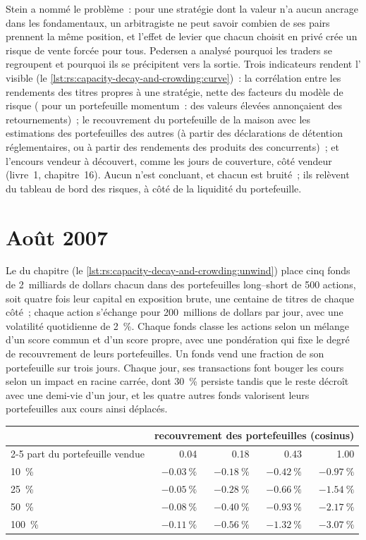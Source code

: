 Stein a nommé le problème~: pour une stratégie dont la valeur n'a aucun ancrage dans les fondamentaux, un arbitragiste ne peut savoir combien de ses pairs prennent la même position,
et l'effet de levier que chacun choisit en privé crée un risque de vente forcée pour tous. Pedersen a analysé pourquoi les traders se regroupent et pourquoi ils se précipitent vers la sortie. Trois indicateurs rendent l'
visible (le \cref{lst:rs:capacity-decay-and-crowding:curve})~: la corrélation entre les rendements des titres propres à une stratégie, nette des facteurs du modèle de risque (
pour un portefeuille momentum~: des valeurs élevées annonçaient des retournements)~; le recouvrement du portefeuille de la maison avec les estimations des portefeuilles des autres (à partir des déclarations de détention réglementaires, ou à partir
des rendements des produits des concurrents)~; et l'encours vendeur à découvert, comme les jours de couverture, côté vendeur (livre~1, chapitre~16). Aucun n'est concluant, et chacun est bruité~; ils
relèvent du tableau de bord des risques, à côté de la liquidité du portefeuille.

\section{Août 2007}

Le  du chapitre (le \cref{lst:rs:capacity-decay-and-crowding:unwind}) place cinq fonds de 2~milliards de dollars chacun dans des portefeuilles long--short de 500 actions, soit quatre fois leur
capital en exposition brute, une centaine de titres de chaque côté~; chaque action s'échange pour 200~millions de dollars par jour, avec une volatilité quotidienne de 2~\%. Chaque fonds classe les actions selon un mélange
d'un score commun et d'un score propre, avec une pondération qui fixe le degré de recouvrement de leurs portefeuilles. Un fonds vend une fraction de son portefeuille sur trois jours. Chaque jour, ses transactions
font bouger les cours selon un impact en racine carrée, dont 30~\% persiste tandis que le reste décroît avec une demi-vie d'un jour, et les quatre autres fonds valorisent leurs portefeuilles aux
cours ainsi déplacés.

\begin{center}
\small
\begin{tabular}{@{}lrrrr@{}}
\toprule
 & \multicolumn{4}{c}{recouvrement des portefeuilles (cosinus)}\\
\cmidrule(l){2-5}
part du portefeuille vendue & 0.04 & 0.18 & 0.43 & 1.00\\
\midrule
10~\% & $-0.03~\%$ & $-0.18~\%$ & $-0.42~\%$ & $-0.97~\%$\\
25~\% & $-0.05~\%$ & $-0.28~\%$ & $-0.66~\%$ & $-1.54~\%$\\
50~\% & $-0.08~\%$ & $-0.40~\%$ & $-0.93~\%$ & $-2.17~\%$\\
100~\% & $-0.11~\%$ & $-0.56~\%$ & $-1.32~\%$ & $-3.07~\%$\\
\bottomrule
\end{tabular}
\end{center}

